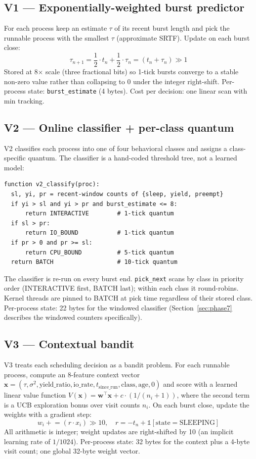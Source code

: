 \documentclass[11pt]{article}
\begin{document}
\subsection*{V1 --- Exponentially-weighted burst predictor}

For each process keep an estimate $\tau$ of its recent burst length and pick
the runnable process with the smallest $\tau$ (approximate SRTF). Update on
each burst close:
\[
\tau_{n+1} = \frac{1}{2} \cdot t_n + \frac{1}{2} \cdot \tau_n
           = (t_n + \tau_n) \gg 1
\]
Stored at 8$\times$ scale (three fractional bits) so 1-tick bursts converge
to a stable non-zero value rather than collapsing to 0 under the integer
right-shift. Per-process state: \texttt{burst\_estimate} (4 bytes). Cost per
decision: one linear scan with min tracking.

\subsection*{V2 --- Online classifier + per-class quantum}

V2 classifies each process into one of four behavioral classes and assigns a
class-specific quantum. The classifier is a hand-coded threshold tree, not a
learned model:

\begin{lstlisting}[style=pseudostyle]
function v2_classify(proc):
  sl, yi, pr = recent-window counts of {sleep, yield, preempt}
  if yi > sl and yi > pr and burst_estimate <= 8:
      return INTERACTIVE        # 1-tick quantum
  if sl > pr:
      return IO_BOUND           # 1-tick quantum
  if pr > 0 and pr >= sl:
      return CPU_BOUND          # 5-tick quantum
  return BATCH                  # 10-tick quantum
\end{lstlisting}

The classifier is re-run on every burst end. \texttt{pick\_next} scans by
class in priority order (INTERACTIVE first, BATCH last); within each class
it round-robins. Kernel threads are pinned to BATCH at pick time regardless
of their stored class. Per-process state: 22 bytes for the windowed
classifier (Section~\ref{sec:phase7} describes the windowed counters
specifically).

\subsection*{V3 --- Contextual bandit}

V3 treats each scheduling decision as a bandit problem. For each runnable
process, compute an 8-feature context vector
$\mathbf{x} = (\tau, \sigma^2, \text{yield\_ratio}, \text{io\_rate},
t_{\text{since\_run}}, \text{class}, \text{age}, 0)$
and score with a learned linear value function
$V(\mathbf{x}) = \mathbf{w}^\top \mathbf{x} + c \cdot (1/(n_i + 1))$,
where the second term is a UCB exploration bonus over visit counts $n_i$.
On each burst close, update the weights with a gradient step:
\[
w_i \mathrel{+}= (r \cdot x_i) \gg 10, \quad
r = -t_n + \mathbb{1}[\text{state} = \text{SLEEPING}]
\]
All arithmetic is integer; weight updates are right-shifted by 10 (an
implicit learning rate of $1/1024$). Per-process state: 32 bytes for the
context plus a 4-byte visit count; one global 32-byte weight vector.
\end{document}
